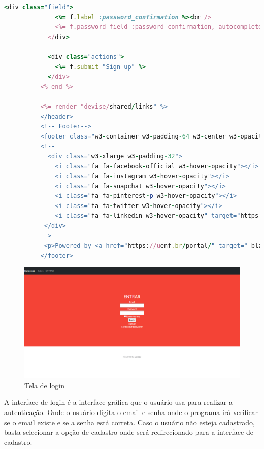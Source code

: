 \begin{itemize}
\begin{lstlisting}[language=Ruby, caption=Interface de cadastro de usuário]
            <div class="field">
              <%= f.label :password_confirmation %><br />
              <%= f.password_field :password_confirmation, autocomplete: "new-password" %>
            </div>

            <div class="actions">
              <%= f.submit "Sign up" %>
            </div>
          <% end %>

          <%= render "devise/shared/links" %>
          </header>
          <!-- Footer-->
          <footer class="w3-container w3-padding-64 w3-center w3-opacity">
          <!--
            <div class="w3-xlarge w3-padding-32">
              <i class="fa fa-facebook-official w3-hover-opacity"></i>
              <i class="fa fa-instagram w3-hover-opacity"></i>
              <i class="fa fa-snapchat w3-hover-opacity"></i>
              <i class="fa fa-pinterest-p w3-hover-opacity"></i>
              <i class="fa fa-twitter w3-hover-opacity"></i>
              <i class="fa fa-linkedin w3-hover-opacity" target="https://www.linkedin.com/in/arretdaniel/">uenf</i>
           </div>
          -->
           <p>Powered by <a href="https://uenf.br/portal/" target="_blank">uenf.br</a></p>
          </footer>

        \end{lstlisting}

        \begin{figure}[H]
          \begin{center}
            \includegraphics[width=12cm]{Pictures/interface/login.png}
            \caption{Tela de login} \label{login}
          \end{center}
        \end{figure}
        A interface de login é a interface gráfica que o usuário usa para realizar a autenticação. Onde o usuário digita o email e senha onde o programa irá verificar se o email existe e se a senha está correta.
        Caso o usuário não esteja cadastrado, basta selecionar a opção de cadastro onde será redirecionado para a interface de cadastro.



\end{itemize}
